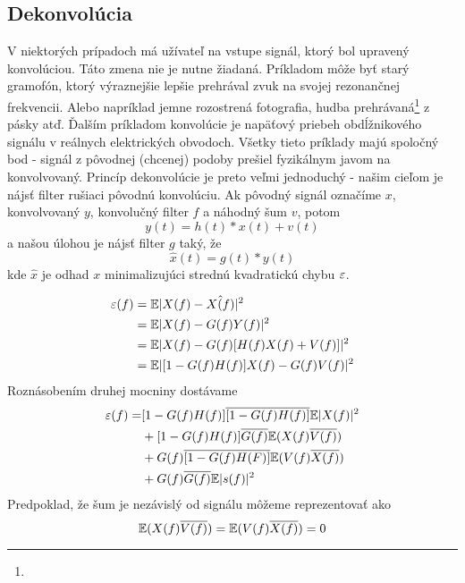 \subsection{Dekonvolúcia}

V niektorých prípadoch má užívateľ na vstupe signál, ktorý bol
upravený konvolúciou. Táto zmena nie je nutne žiadaná. Príkladom môže
byť starý gramofón, ktorý výraznejšie lepšie prehrával zvuk na
svojej rezonančnej frekvencii. Alebo napríklad jemne rozostrená
fotografia, hudba prehrávaná\footnote{} z pásky atď.
Ďalším príkladom konvolúcie
je napäťový priebeh obdĺžnikového signálu v reálnych elektrických
obvodoch. Všetky tieto príklady majú spoločný bod - signál z pôvodnej
(chcenej) podoby prešiel fyzikálnym javom na konvolvovaný. Princíp
dekonvolúcie je preto veľmi jednoduchý - našim cieľom je nájsť filter
rušiaci pôvodnú konvolúciu.
Ak pôvodný signál označíme $x$, konvolvovaný $y$, konvolučný
filter $f$ a náhodný šum $v$, potom
\begin{equation*}
    y(t) = h(t)*x(t) + v(t)
\end{equation*}
a našou úlohou je nájsť filter $g$ taký, že
\begin{equation*}
  \hat{x}(t) = g(t)*y(t)
\end{equation*}
kde $\hat{x}$ je odhad $x$ minimalizujúci strednú kvadratickú chybu
$\varepsilon$.

\def\E{{\mathbb{E}}}
\begin{equation*}
\begin{split}
\eps(f) &= \E | X(f) - \hat{X(f)}|^2 \\
        &= \E | X(f) - G(f) Y(f)| ^2 \\
        &= \E | X(f) - G(f) [ H(f) X(f) +V(f)]|^2 \\
        &= \E | [ 1 - G(f) H(f)] X(f) - G(f) V(f)|^2
\end{split}        
\end{equation*}
Roznásobením druhej mocniny dostávame
\begin{equation*}
\begin{split}
\eps(f) =& [1 - G(f) H(f)]\conjug{[1 - G(f) H(f)]} \E| X(f)|^2 \\
  &+ [1-G(f) H(f)]\conjug{G(f)} \E( X(f) \conjug{V(f)}) \\
  &+ G(f) \conjug{[1-G(f)H(F)]} \E( V(f) \conjug{X(f)}) \\
  &+ G(f) \conjug{G(f)} \E|s(f)|^2
\end{split}
\end{equation*}
Predpoklad, že šum je nezávislý od signálu môžeme reprezentovať ako
\begin{equation*}
 \E( X(f)\conjug{V(f)}) = \E(V(f)\conjug{X(f)}) = 0
\end{equation*}

